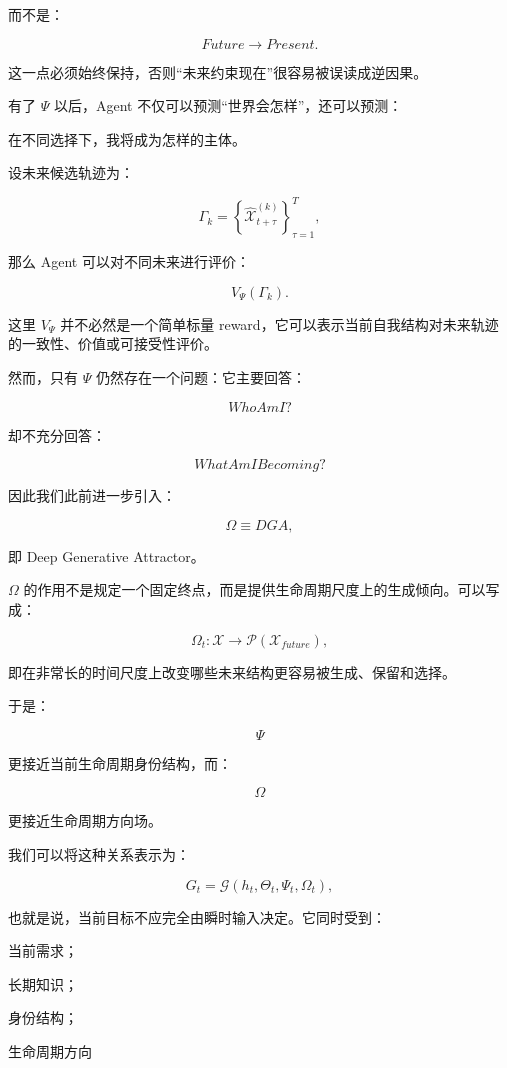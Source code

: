 而不是：

\[
Future
\rightarrow
Present.
\]

这一点必须始终保持，否则“未来约束现在”很容易被误读成逆因果。

有了 $\Psi$ 以后，Agent 不仅可以预测“世界会怎样”，还可以预测：

\begin{statementbox}
在不同选择下，我将成为怎样的主体。
\end{statementbox}

设未来候选轨迹为：

\[
\Gamma_k
=
\left\{
\hat{\mathcal{X}}_{t+\tau}^{(k)}
\right\}_{\tau=1}^{T},
\]

那么 Agent 可以对不同未来进行评价：

\[
V_{\Psi}
(\Gamma_k).
\]

这里 $V_{\Psi}$ 并不必然是一个简单标量 reward，它可以表示当前自我结构对未来轨迹的一致性、价值或可接受性评价。

然而，只有 $\Psi$ 仍然存在一个问题：它主要回答：

\[
WhoAmI?
\]

却不充分回答：

\[
WhatAmIBecoming?
\]

因此我们此前进一步引入：

\[
\Omega
\equiv
DGA,
\]

即 Deep Generative Attractor。

$\Omega$ 的作用不是规定一个固定终点，而是提供生命周期尺度上的生成倾向。可以写成：

\[
\Omega_t
:
\mathcal{X}
\rightarrow
\mathcal{P}
\left(
\mathcal{X}_{future}
\right),
\]

即在非常长的时间尺度上改变哪些未来结构更容易被生成、保留和选择。

于是：

\[
\Psi
\]

更接近当前生命周期身份结构，而：

\[
\Omega
\]

更接近生命周期方向场。

我们可以将这种关系表示为：

\[
G_t
=
\mathcal{G}
\left(
h_t,
\Theta_t,
\Psi_t,
\Omega_t
\right),
\]

也就是说，当前目标不应完全由瞬时输入决定。它同时受到：

当前需求；

长期知识；

身份结构；

生命周期方向

